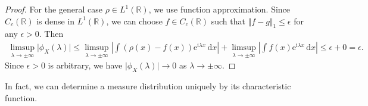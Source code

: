 \documentclass{article}
\numberwithin{equation}{section}
\newcommand{\e}{\mathrm{e}}
\renewcommand{\d}{\mathrm{d}}
\renewcommand{\i}{\mathrm{i}}
\theoremstyle{plain}
\theoremstyle{definition}
\begin{document}
\begin{proof}
For the general case $\rho\in L^1(\mathbb{R})$, we use function approximation. Since $C_c(\mathbb{R})$ is dense in $L^1(\mathbb{R})$, we can choose $f\in C_c(\mathbb{R})$ such that $\Vert f-g\Vert_1\leq\epsilon$ for any $\epsilon>0$. Then
\begin{align*}
	\limsup_{\lambda\to\pm\infty}\vert\phi_X(\lambda)\vert \leq\limsup_{\lambda\to\pm\infty}\left\vert\int(\rho(x)-f(x))\e^{\i\lambda x}\,\d x\right\vert + \limsup_{\lambda\to\pm\infty}\left\vert\int f(x)\e^{\i\lambda x}\,\d x\right\vert \leq\epsilon+0=\epsilon.
\end{align*}
Since $\epsilon>0$ is arbitrary, we have $\vert\phi_X(\lambda)\vert\to 0$ as $\lambda\to\pm\infty$.
\end{proof}

In fact, we can determine a measure distribution uniquely by its characteristic function.
\end{document}
